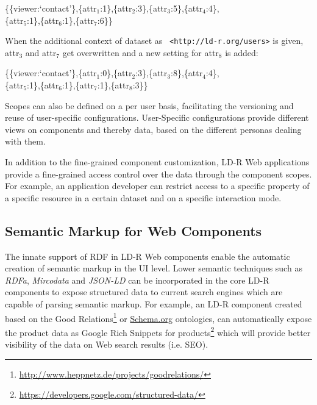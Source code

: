 \documentclass{acm_proc_article-sp}
\begin{document}
\{\{viewer:`contact'\},\{attr$_{\text{1}}$:1\},\{attr$_{\text{2}}$:3\},\{attr$_{\text{3}}$:5\},\{attr$_{\text{4}}$:4\},\\\{attr$_{\text{5}}$:1\},\{attr$_{\text{6}}$:1\},\{attr$_{\text{7}}$:6\}\} 

When the additional context of dataset as ~\texttt{<http://ld-r.org/users>} is given, attr$_{\text{3}}$ and attr$_{\text{7}}$ get overwritten and a new setting for attr$_{\text{8}}$ is added:

\{\{viewer:`contact'\},\{attr$_{\text{1}}$:0\},\{attr$_{\text{2}}$:3\},\{attr$_{\text{3}}$:8\},\{attr$_{\text{4}}$:4\},\\\{attr$_{\text{5}}$:1\},\{attr$_{\text{6}}$:1\},\{attr$_{\text{7}}$:1\},\{attr$_{\text{8}}$:3\}\} 

Scopes can also be defined on a per user basis, facilitating the versioning and reuse of user-specific configurations.
User-Specific configurations provide different views on components and thereby data, based on the different personas dealing with them.

In addition to the fine-grained component customization, LD-R Web applications provide a fine-grained access control over the data through the component scopes.
For example, an application developer can restrict access to a specific property of a specific resource in a certain dataset and on a specific interaction mode.

\subsection{Semantic Markup for Web Components}
\label{sec:markup}
The innate support of RDF in LD-R Web components enable the automatic creation of semantic markup in the UI level.
Lower semantic techniques such as \emph{RDFa}, \emph{Mircodata} and \emph{JSON-LD} can be incorporated in the core LD-R components to expose structured data to current search engines which are capable of parsing semantic markup.
For example, an LD-R component created based on the Good Relations\footnote{\url{http://www.heppnetz.de/projects/goodrelations/}} or \url{Schema.org} ontologies, can automatically expose the product data as Google Rich Snippets for products\footnote{\url{https://developers.google.com/structured-data/}} which will provide better visibility of the data on Web search results (i.e. SEO).
\end{document}
